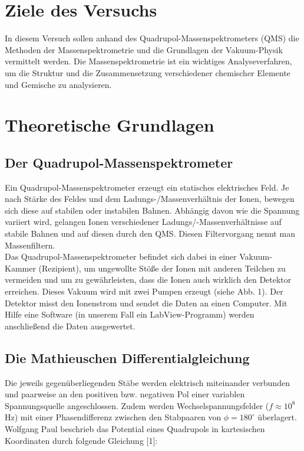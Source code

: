 \section{Ziele des Versuchs}
In diesem Versuch sollen anhand des Quadrupol-Massenspektrometers (QMS) die Methoden der Massenspektrometrie und die Grundlagen der Vakuum-Physik vermittelt werden. Die Massenspektrometrie ist ein wichtiges Analyseverfahren, um die Struktur und die Zusammensetzung verschiedener chemischer Elemente und Gemische zu analysieren.\\

\section{Theoretische Grundlagen}
\subsection{Der Quadrupol-Massenspektrometer}
Ein Quadrupol-Massenspektrometer erzeugt ein statisches elektrisches Feld. Je nach Stärke des Feldes und dem Ladungs-/Massenverhältnis der Ionen, bewegen sich diese auf stabilen oder instabilen Bahnen. Abhängig davon wie die Spannung variiert wird, gelangen Ionen verschiedener Ladungs/-Massenverhältnisse auf stabile Bahnen und auf diesen durch den QMS. Diesen Filtervorgang nennt man Massenfiltern.\\
Das Quadrupol-Massenspektrometer befindet sich dabei in einer Vakuum-Kammer (Rezipient), um ungewollte Stöße der Ionen mit anderen Teilchen zu vermeiden und um zu gewährleisten, dass die Ionen auch wirklich den Detektor erreichen. Dieses Vakuum wird mit zwei Pumpen erzeugt (siehe Abb. 1). Der Detektor misst den Ionenstrom und sendet die Daten an einen Computer. Mit Hilfe eine Software (in unserem Fall ein LabView-Programm) werden anschließend die Daten ausgewertet.


\newpage
\subsection{Die Mathieuschen Differentialgleichung}
Die jeweils gegenüberliegenden Stäbe werden elektrisch miteinander verbunden und paarweise an den positiven bzw. negativen Pol einer variablen Spannungsquelle angeschlossen. Zudem werden Wechselspannungsfelder ($f \approx 10^8$ Hz) mit einer Phasendifferenz zwischen den Stabpaaren von $\phi = 180^{\circ}$ überlagert.
Wolfgang Paul beschrieb das Potential eines Quadrupols in kartesischen Koordinaten durch folgende Gleichung [1]:

